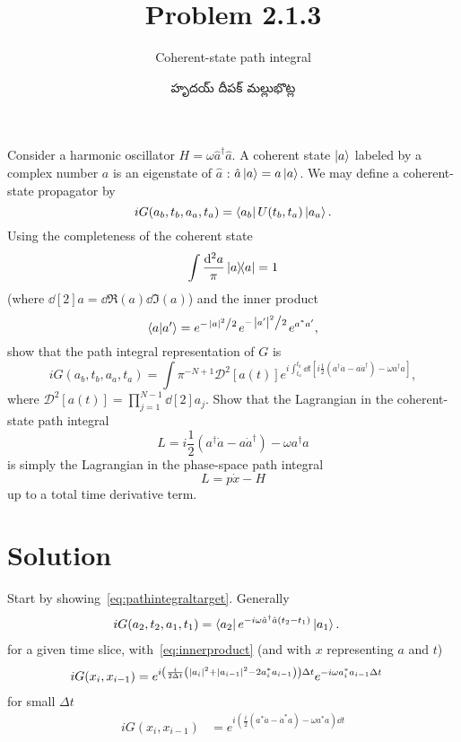 \documentclass{article}
\title{Problem 2.1.3}
\subtitle{Coherent-state path integral}
\author{\begin{telugu}హృదయ్ దీపక్ మల్లుభొట్ల\end{telugu}}
\date{}
\newcommand{\msr}{\mathcal{D}}
\begin{document}
	\maketitle
	Consider a harmonic oscillator $H = \omega \hat{a}^\dagger \hat{a}$.
	A coherent state $\ket{a}$ labeled by a complex number $a$ is an eigenstate of $\hat{a}$ : $\hat{a}\ket{a} = a \ket{a}$.
	We may define a coherent-state propagator by
	\begin{equation}
		i G(a_b, t_b, a_a, t_a) = \bra{a_b} U(t_b, t_a) \ket{a_a}.
	\end{equation}
	Using the completeness of the coherent state
	\begin{equation}
		\int \frac{\dd[2]{a}}{\pi}\dyad{a}{a} = 1 \label{eq:identity}
	\end{equation}
	(where $\dd[2]{a} = \dd{\Re(a)} \dd{\Im(a)}$) and the inner product
	\begin{equation}
		\bra{a}\ket{a'} = e^{-\flatfrac{\abs{a}^2}{2}} e^{-\flatfrac{\abs{a'}^2}{2}} e^{a^\ast a'}, \label{eq:innerproduct}
	\end{equation}
	show that the path integral representation of $G$ is
	\begin{equation}
		i G(a_b, t_b, a_a, t_a) = \int \pi^{-N + 1} \msr^2[a(t)] e^{i \int_{t_a}^{t_b} \dd{t} \left[i \frac12 \left(a^\dagger \dot{a} - a \dot{a}^\dagger \right) - \omega a^\dagger a \right]}, \label{eq:pathintegraltarget}
	\end{equation}
	where $\msr^2[a(t)] = \prod_{j=1}^{N-1} \dd[2]a_j$.
	Show that the Lagrangian in the coherent-state path integral
	\begin{equation}
		L = i\frac12 \left(a^\dagger \dot{a} - a \dot{a}^\dagger \right) - \omega a^\dagger a
	\end{equation}
	is simply the Lagrangian in the phase-space path integral
	\begin{equation}
		L = p\dot{x} - H
	\end{equation}
	up to a total time derivative term.

	\section{Solution} \label{sec:solution}

	Start by showing~\eqref{eq:pathintegraltarget}.
	Generally
	\begin{align}
		i G(a_2, t_2, a_1, t_1) &= \bra{a_2} e^{-i \omega \hat{a}^\dagger \hat{a} (t_2 - t_1)} \ket{a_1}.
	\end{align}
	\triv for a given time slice, with~\eqref{eq:innerproduct} (and with $x$ representing $a$ and $t$)
	\begin{align}
		i G(x_i, x_{i-1}) &= e^{i \left(\frac{i}{2 \Delta t} \left( \abs{a_i}^2 + \abs{a_{i-1}}^2 - 2 a_i^\ast a_{i-1}\right)\right) \Delta t}  e^{-i \omega a_i^\ast a_{i-1} \Delta t} \label{eq:fullexponential}
	\end{align}
	\triv for small $\Delta t$
	\begin{align}
		i G(x_i, x_{i-1}) &= e^{i \left( \frac{i}{2} \left( a^\ast \dot{a} -  \dot{a}^\ast  a \right) - \omega a^\ast a \right) \dd{t}} \label{eq:oneslice}
	\end{align}
\end{document}
